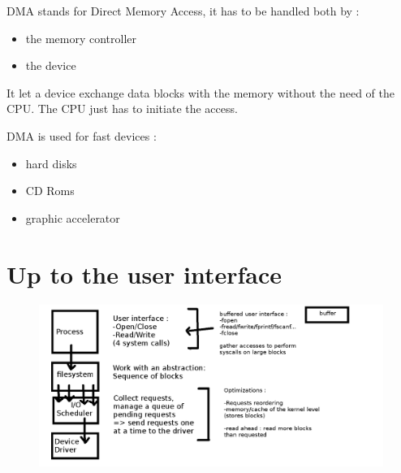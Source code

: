 DMA stands for Direct Memory Access, it has to be handled both by :
\begin{itemize}
  \item the memory controller
  \item the device
\end{itemize}

It let a device exchange data blocks with the memory without the need of the CPU.
The CPU just has to initiate the access.


DMA is used for fast devices :
\begin{itemize}
  \item hard disks
  \item CD Roms
  \item graphic accelerator
\end{itemize}

\section{Up to the user interface}

\begin{figure}[h!]
  \begin{center}
    \includegraphics[width=\textwidth]{user_interface.png}
    \label{fig:6}
  \end{center}
\end{figure}

